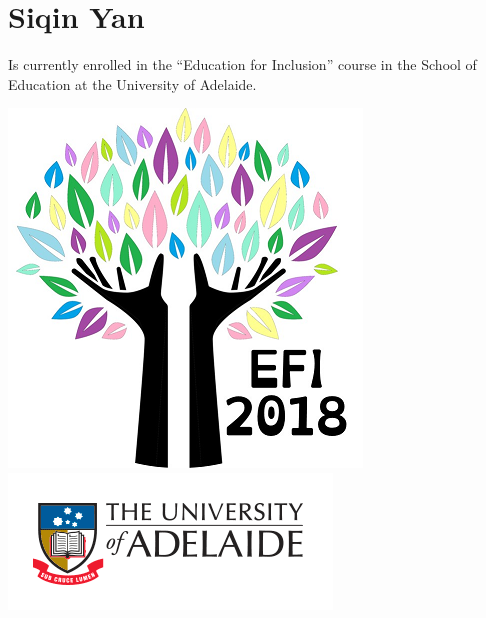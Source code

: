 \documentclass[twoside,12pt,a4paper,notitlepage]{memoir}
\begin{document}
\section*{Siqin Yan}

Is currently enrolled in the ``Education for Inclusion'' course in the School of Education at the University of Adelaide.




\pagebreak
\cleardoublepage
\vspace*{0cm}
\vfill
\includegraphics[scale=0.5]{colour_tree.png}
\hfill
\includegraphics[scale=1]{uoa-logo-col-horiz.png}
\end{document}
